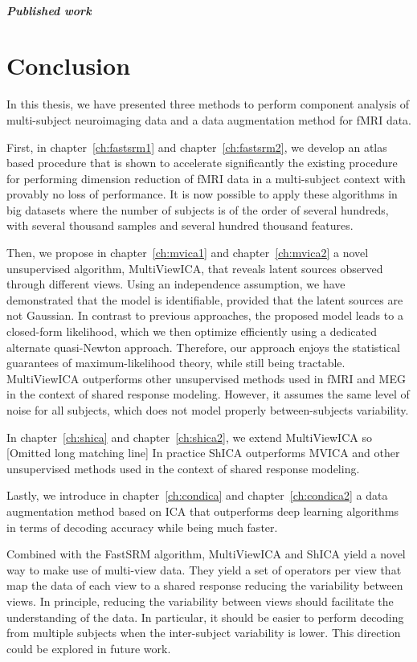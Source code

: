 \documentclass[ twoside,openright,titlepage,numbers=noenddot,%
                headinclude,footinclude,cleardoublepage=empty,abstract=on,
                BCOR=5mm,paper=a4,fontsize=11pt, 
                ]{scrreprt}
\begin{document}
\paragraph{Published work}

\chapter{Conclusion}
In this thesis, we have presented three methods to perform component
analysis of multi-subject neuroimaging data and a data augmentation method for
fMRI data.

First, in chapter~\ref{ch:fastsrm1} and chapter~\ref{ch:fastsrm2}, we develop an
atlas based procedure that is shown to accelerate significantly the existing
procedure for performing dimension reduction of fMRI data in a multi-subject
context with provably no loss of performance. It is now possible to apply these
algorithms in big datasets where the number of subjects is of the order of
several hundreds, with several thousand samples and several hundred thousand features.

Then, we propose in chapter~\ref{ch:mvica1} and chapter~\ref{ch:mvica2}
a novel unsupervised algorithm, MultiViewICA, that reveals latent sources observed through different views. Using an independence assumption, we have demonstrated that the model is identifiable, provided that the latent
sources are not Gaussian. In contrast to previous approaches, the proposed model leads to a closed-form likelihood, which we then optimize efficiently using a dedicated alternate quasi-Newton approach.
Therefore, our approach enjoys the statistical guarantees of maximum-likelihood
theory, while still being tractable. MultiViewICA outperforms other unsupervised
methods used in fMRI and MEG in the context of shared response modeling. However,
it assumes the same level of noise for all
subjects, which does not model properly between-subjects variability.

In chapter~\ref{ch:shica} and chapter~\ref{ch:shica2}, we extend MultiViewICA so
[Omitted long matching line]
In practice ShICA outperforms MVICA and other unsupervised methods used in the
context of shared response modeling.

Lastly, we introduce in chapter~\ref{ch:condica} and chapter~\ref{ch:condica2} a data
augmentation method based on ICA that outperforms deep learning algorithms in
terms of decoding accuracy while being much faster.

Combined with the FastSRM algorithm, MultiViewICA and ShICA yield a novel way to
make use of multi-view data. They yield a set of operators per view that map
the data of each view to a shared response reducing the variability between views.
In principle, reducing the variability between views should facilitate the
understanding of the data. In particular, it should be easier to perform
decoding from multiple subjects when the inter-subject variability is lower.
This direction could be explored in future work.
\end{document}
